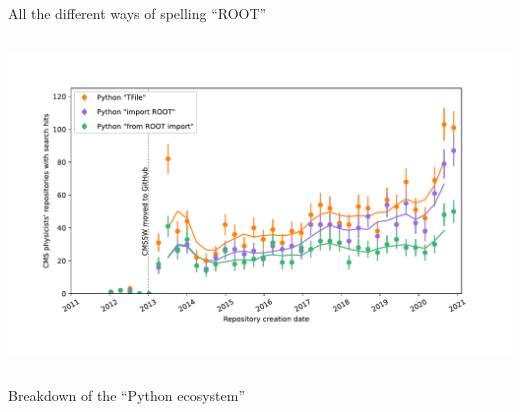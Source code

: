 \documentclass[aspectratio=169]{beamer}
\begin{document}
\begin{frame}{All the different ways of spelling ``ROOT''}
\vspace{-0.75 cm}
\begin{columns}
\includegraphics[width=\linewidth]{PLOTS/gihub-search-python-root-variations.pdf}
\end{columns}
\end{frame}

\begin{frame}{Breakdown of the ``Python ecosystem''}
\vspace{-0.75 cm}
\begin{columns}
\end{columns}
\end{frame}
\end{document}
